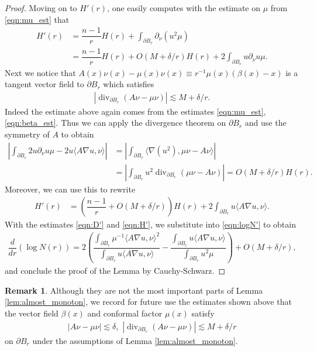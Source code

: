 \documentclass[12pt,leqno]{amsart}
\numberwithin{equation}{section}
\theoremstyle{definition}
\newtheorem{rmk}[lemma]{\bf Remark}
\newcommand{\abs}[1]{\left \lvert #1 \right \rvert}
\DeclareMathOperator{\divv}{\mathrm{div}}
\begin{document}
\begin{proof}
		Moving on to $H'(r)$, one easily computes with the estimate on $\mu$ from \eqref{eqn:mu_est} that 
		\begin{align*}
			H'(r) & = \dfrac{n-1}{r} H(r) + \int_{\partial B_r} \partial_\nu ( u^2 \mu) \\
			& = \dfrac{n-1}{r} H(r) + O(M + \delta/r) H(r) + 2\int_{\partial B_r} u \partial_\nu u \mu. 
		\end{align*}
		Next we notice that $A(x) \nu(x) - \mu(x) \nu(x) \equiv r^{-1} \mu(x) (\beta(x) - x)$ is a tangent vector field to $\partial B_r$ which satisfies
		\begin{align*}
			\abs{\divv_{\partial B_r} (A\nu - \mu \nu)} \lesssim M + \delta/r.
		\end{align*}
		Indeed the estimate above again comes from the estimates \eqref{eqn:mu_est}, \eqref{eqn:beta_est}. Thus we can apply the divergence theorem on $\partial B_r$ and use the symmetry of $A$ to obtain
		\begin{align*}
			\abs{ \int_{\partial B_r} 2 u \partial_\nu u \mu  - 2 u \langle A \nabla u, \nu \rangle } & = \abs{ \int_{\partial B_r} \langle \nabla (u^2), \mu \nu - A \nu \rangle   } \\
			& = \abs{ \int_{\partial B_r}  u^2 \divv_{\partial B_r}(\mu \nu - A \nu) } = O(M + \delta/r) H(r).
		\end{align*}
		Moreover, we can use this to rewrite
		\begin{align}\label{eqn:H'}
			H'(r) & = \left( \dfrac{n-1}{r} + O(M + \delta/r) \right) H(r) + 2 \int_{\partial B_r} u \langle A \nabla u, \nu \rangle. 
		\end{align}
		With the estimates \eqref{eqn:D'} and \eqref{eqn:H'}, we substitute into \eqref{eqn:logN'} to obtain
		\begin{align*}
			\dfrac{d}{dr} \left( \log N(r) \right) = 2 \left( \dfrac{\int_{\partial B_r} \mu^{-1} \langle A \nabla u, \nu \rangle^2 }{ \int_{\partial B_r} u \langle A \nabla u, \nu \rangle }  - \dfrac{  \int_{\partial B_r} u \langle A \nabla u, \nu \rangle }{  \int_{\partial B_r} u^2 \mu   }\right) + O(M + \delta/r),
		\end{align*}
		and conclude the proof of the Lemma by Cauchy-Schwarz. 
	\end{proof}

	\begin{rmk}
		Although they are not the most important parts of Lemma \ref{lem:almost_monoton}, we record for future use the estimates shown above that the vector field $\beta(x)$ and conformal factor $\mu(x)$ satisfy
		\begin{align*}
			\abs{ A \nu - \mu \nu } \lesssim \delta, \, \, \abs{ \divv_{\partial B_r} (A \nu - \mu \nu)   } \lesssim M + \delta/r 
		\end{align*}
		on $\partial B_r$ under the assumptions of Lemma \ref{lem:almost_monoton}.
	\end{rmk}
	
\end{document}

